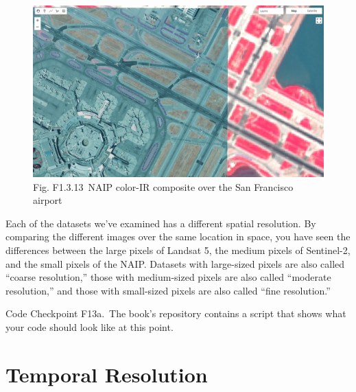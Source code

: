 \documentclass[
  letterpaper,
  DIV=11,
  numbers=noendperiod]{scrreprt}
\begin{document}
\begin{figure}

{\centering \includegraphics{./F1/image32.png}

}

\caption{Fig. F1.3.13~NAIP color-IR composite over the San Francisco
airport}

\end{figure}

Each of the datasets we've examined has a different spatial resolution.
By comparing the different images over the same location in space, you
have seen the differences between the large pixels of Landsat 5, the
medium pixels of Sentinel-2, and the small pixels of the NAIP. Datasets
with large-sized pixels are also called ``coarse resolution,'' those
with medium-sized pixels are also called ``moderate resolution,'' and
those with small-sized pixels are also called ``fine resolution.''

\begin{tcolorbox}[enhanced jigsaw, left=2mm, breakable, rightrule=.15mm, opacityback=0, colframe=quarto-callout-note-color-frame, colbacktitle=quarto-callout-note-color!10!white, arc=.35mm, opacitybacktitle=0.6, toptitle=1mm, colback=white, leftrule=.75mm, title=\textcolor{quarto-callout-note-color}{\faInfo}\hspace{0.5em}{Note}, toprule=.15mm, bottomtitle=1mm, titlerule=0mm, bottomrule=.15mm, coltitle=black]

Code Checkpoint F13a.~The book's repository contains a script that shows
what your code should look like at this point.

\end{tcolorbox}

\hypertarget{temporal-resolution-1}{%
\section{Temporal Resolution}\label{temporal-resolution-1}}
\end{document}
